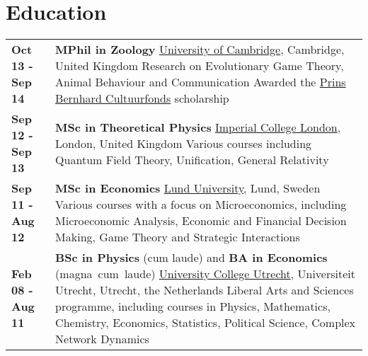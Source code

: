 \documentclass[a4paper,9pt]{extarticle}
\begin{document}
\vspace{0mm}

\section*{Education}

\begin{center}
\setlength{\tabcolsep}{0mm}
\begin{tabular}{p{}p{}}
\textbf{Oct 13 - Sep 14}&\textbf{MPhil in Zoology}\newline
\href{https://www.zoo.cam.ac.uk}{University of Cambridge}, Cambridge, United Kingdom\newline
Research on Evolutionary Game Theory, Animal Behaviour and Communication\newline
Awarded the \href{http://www.prinsbernhardcultuurfonds.nl}{Prins Bernhard Cultuurfonds} scholarship
\vspace{2mm}\\
\textbf{Sep 12 - Sep 13}&\textbf{MSc in Theoretical Physics}\newline
\href{https://www.imperial.ac.uk}{Imperial College London}, London, United Kingdom\newline
Various courses including Quantum Field Theory, Unification, General Relativity
\vspace{2mm}\\
\textbf{Sep 11 - Aug 12}&\textbf{MSc in Economics}\newline
\href{http://www.lunduniversity.lu.se}{Lund University}, Lund, Sweden\newline
Various courses with a focus on Microeconomics, including Microeconomic Analysis, Economic and Financial Decision Making, Game Theory and Strategic Interactions
\vspace{2mm}\\
\textbf{Feb 08 - Aug 11}&\textbf{BSc in Physics} (cum laude) and \textbf{BA in Economics} (magna~cum~laude)\newline
\href{https://www.uu.nl/en/organisation/university-college-utrecht/}{University College Utrecht}, Universiteit Utrecht, Utrecht, the Netherlands\newline
Liberal Arts and Sciences programme, including courses in Physics, Mathematics, Chemistry, Economics, Statistics, Political Science, Complex Network Dynamics\newline

\end{tabular}
\end{center}
\end{document}
